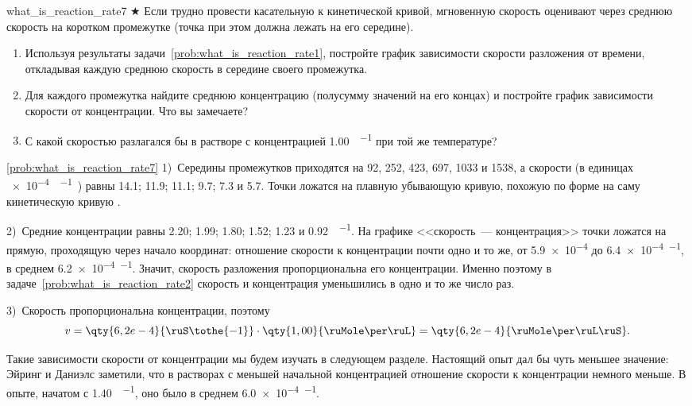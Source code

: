 \begin{problem}{}{what_is_reaction_rate7}
    $\bigstar$ Если трудно провести касательную к кинетической кривой, мгновенную скорость оценивают через среднюю скорость на коротком промежутке (точка при этом должна лежать на его середине).
    \begin{enumerate}[label=\arabic*)]
        \item Используя результаты задачи~\ref{prob:what_is_reaction_rate1}, постройте график зависимости скорости разложения  от времени, откладывая каждую среднюю скорость в середине своего промежутка.
        \item Для каждого промежутка найдите среднюю концентрацию  (полусумму значений на его концах) и постройте график зависимости скорости от концентрации. Что вы замечаете?
        \item С какой скоростью разлагался бы  в растворе с концентрацией \qty{1,00}{\ruMole\per\ruL} при той же температуре?
    \end{enumerate}
    \begin{sol}{\ref{prob:what_is_reaction_rate7}}
        1)~Середины промежутков приходятся на 92, 252, 423, 697, 1033 и \qty{1538}{\ruS}, а скорости (в единицах \qty{e-4}{\ruMole\per\ruL\ruS}) равны \num{14,1}; \num{11,9}; \num{11,1}; \num{9,7}; \num{7,3} и \num{5,7}. Точки ложатся на плавную убывающую кривую, похожую по форме на саму кинетическую кривую .

        2)~Средние концентрации равны \num{2,20}; \num{1,99}; \num{1,80}; \num{1,52}; \num{1,23} и \qty{0,92}{\ruMole\per\ruL}. На графике <<скорость~--- концентрация>> точки ложатся на прямую, проходящую через начало координат: отношение скорости к концентрации почти одно и то же, от \num{5,9e-4} до \qty{6,4e-4}{\ruS\tothe{-1}}, в среднем \qty{6,2e-4}{\ruS\tothe{-1}}. Значит, скорость разложения  пропорциональна его концентрации. Именно поэтому в задаче~\ref{prob:what_is_reaction_rate2} скорость и концентрация уменьшились в одно и то же число раз.

        3)~Скорость пропорциональна концентрации, поэтому
        \begin{equation*}
            v = \qty{6,2e-4}{\ruS\tothe{-1}} \cdot \qty{1,00}{\ruMole\per\ruL} = \qty{6,2e-4}{\ruMole\per\ruL\ruS}.
        \end{equation*}

        Такие зависимости скорости от концентрации мы будем изучать в следующем разделе. Настоящий опыт дал бы чуть меньшее значение: Эйринг и Даниэлс заметили, что в растворах с меньшей начальной концентрацией отношение скорости к концентрации немного меньше. В опыте, начатом с \qty{1,40}{\ruMole\per\ruL}, оно было в среднем \qty{6,0e-4}{\ruS\tothe{-1}}.
    \end{sol}
\end{problem}

\clearpage